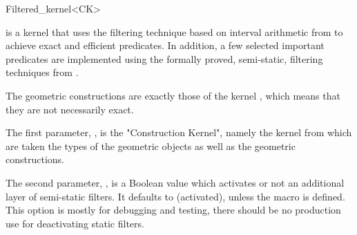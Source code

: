 \begin{ccRefClass}{Filtered_kernel<CK>}


\KernelRefLayout\gdef\ccTagOperatorLayout{\ccFalse}

\ccDefinition

\ccClassTemplateName is a kernel that uses the filtering technique based
on interval arithmetic from \cite{cgal:bbp-iayed-01} to achieve
exact and efficient predicates.  In addition, a few selected important
predicates are implemented using the formally proved, semi-static, filtering
techniques from \cite{cgal:mp-fcafg-05}.

The geometric constructions are exactly those
of the kernel , which means that they are not necessarily exact.






\ccParameters

The first parameter, , is the "Construction Kernel", namely the kernel
from which are taken the types of the geometric objects as well as the
geometric constructions.

The second parameter, , is a Boolean value which
activates or not an additional layer of semi-static filters.  It defaults to
 (activated), unless the  macro is
defined.  This option is mostly for debugging and testing, there should be no
production use for deactivating static filters.


\end{ccRefClass}
